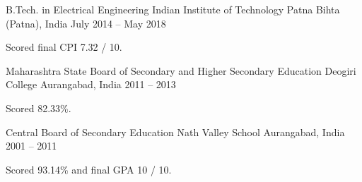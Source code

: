 
\begin{cventries}

\cventry
	{B.Tech. in Electrical Engineering} %
	{Indian Institute of Technology Patna} %
	{Bihta (Patna), India} %
	{July 2014 -- May 2018} %
	{\begin{cvitems} %
		\item {Scored final CPI 7.32 / 10.}
	\end{cvitems}}

\cventry
	{Maharashtra State Board of Secondary and Higher Secondary Education} %
	{Deogiri College} %
	{Aurangabad, India} %
	{2011 -- 2013} %
	{\begin{cvitems} %
		\item {Scored 82.33\%.}
	\end{cvitems}}

\cventry
	{Central Board of Secondary Education} %
	{Nath Valley School} %
	{Aurangabad, India} %
	{2001 -- 2011} %
	{\begin{cvitems} %
		\item {Scored 93.14\% and final GPA 10 / 10.}
	\end{cvitems}}

\end{cventries}
